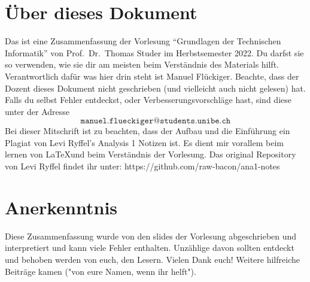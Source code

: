 \documentclass[../main.tex]{subfiles}
\begin{document}
\section*{Über dieses Dokument}
Das ist eine Zusammenfassung
der Vorlesung ``Grundlagen der Technischen Informatik''
von Prof.\ Dr.\ Thomas Studer
im Herbstsemester 2022.
Du darfst sie so verwenden,
wie sie dir am meisten
beim Verständnis des Materials
hilft.
Verantwortlich dafür was
hier drin steht ist Manuel Flückiger.
Beachte, dass der Dozent dieses Dokument
nicht geschrieben (und vielleicht auch nicht gelesen) hat.
Falls du selbst Fehler entdeckst, oder Verbesserungsvorschläge hast,
sind diese unter der Adresse
\[
  \texttt{manuel.flueckiger@students.unibe.ch}
\]
Bei dieser Mitschrift ist zu beachten, dass der Aufbau und die 
Einführung ein Plagiat von Levi Ryffel's Analysis 1 Notizen ist.
Es dient mir vorallem beim lernen von \LaTeX und beim Verständnis der Vorlesung.
Das original Repository von Levi Ryffel findet ihr  
unter: https://github.com/raw-bacon/ana1-notes


\section*{Anerkenntnis}
Diese Zusammenfassung wurde von den slides der Vorlesung abgeschrieben und interpretiert und
kann viele Fehler enthalten.
Unzählige davon sollten entdeckt und behoben werden
von euch, den Lesern.
Vielen Dank euch! Weitere hilfreiche Beiträge kamen
("von eure Namen, wenn ihr helft").
\end{document}
